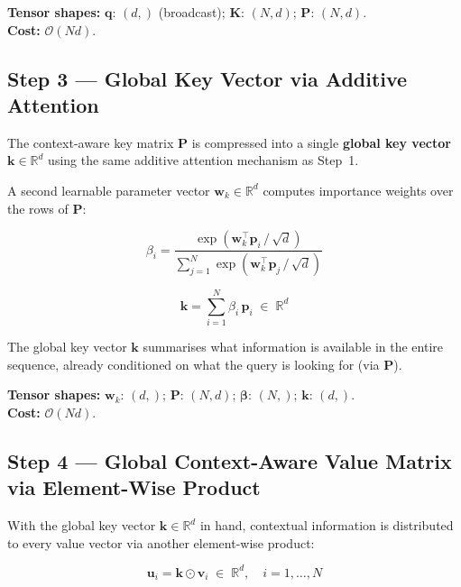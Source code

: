 \documentclass[11pt,a4paper]{article}
\newcommand{\mat}[1]{\mathbf{#1}}
\newcommand{\vect}[1]{\mathbf{#1}}
\newcommand{\R}{\mathbb{R}}
\newcommand{\odotop}{\odot}
\theoremstyle{definition}
\begin{document}
\noindent \textbf{Tensor shapes:} $\vect{q}:\,(d,)$ (broadcast);\; $\mat{K}:\,(N,d)$;\;
$\mat{P}:\,(N,d)$.\\
\textbf{Cost:} $\mathcal{O}(Nd)$.

\subsection{Step 3 --- Global Key Vector via Additive Attention}
\label{sec:global_key}

The context-aware key matrix $\mat{P}$ is compressed into a single \textbf{global key vector}
$\vect{k}\in\R^{d}$ using the same additive attention mechanism as Step~1.

A second learnable parameter vector $\vect{w}_{k}\in\R^{d}$ computes importance weights over
the rows of $\mat{P}$:

\begin{equation*}
  \beta_i =
  \frac{\exp\!\left(\vect{w}_{k}^{\top}\vect{p}_i\,/\,\sqrt{d}\right)}
       {\displaystyle\sum_{j=1}^{N}\exp\!\left(\vect{w}_{k}^{\top}\vect{p}_j\,/\,\sqrt{d}\right)}
\end{equation*}

\begin{equation*}
  \vect{k} = \sum_{i=1}^{N}\beta_i\,\vect{p}_i \;\in\; \R^{d}
\end{equation*}

\noindent The global key vector $\vect{k}$ summarises what information is available in the
entire sequence, already conditioned on what the query is looking for (via $\mat{P}$).

\noindent \textbf{Tensor shapes:} $\vect{w}_{k}:\,(d,)$;\; $\mat{P}:\,(N,d)$;\;
$\bm{\beta}:\,(N,)$;\; $\vect{k}:\,(d,)$.\\
\textbf{Cost:} $\mathcal{O}(Nd)$.

\subsection{Step 4 --- Global Context-Aware Value Matrix via Element-Wise Product}
\label{sec:value_interaction}

With the global key vector $\vect{k}\in\R^{d}$ in hand, contextual information is distributed
to every value vector via another element-wise product:

\begin{equation*}
  \vect{u}_i = \vect{k} \odotop \vect{v}_i \;\in\; \R^{d}, \quad i=1,\ldots,N
\end{equation*}
\end{document}
